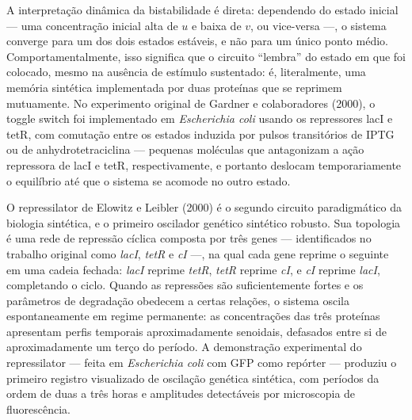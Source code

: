 A interpretação dinâmica da bistabilidade é direta: dependendo do estado inicial --- uma concentração inicial alta de $u$ e baixa de $v$, ou vice-versa ---, o sistema converge para um dos dois estados estáveis, e não para um único ponto médio. Comportamentalmente, isso significa que o circuito ``lembra'' do estado em que foi colocado, mesmo na ausência de estímulo sustentado: é, literalmente, uma memória sintética implementada por duas proteínas que se reprimem mutuamente. No experimento original de Gardner e colaboradores (2000), o toggle switch foi implementado em \textit{Escherichia coli} usando os repressores lacI e tetR, com comutação entre os estados induzida por pulsos transitórios de IPTG ou de anhydrotetraciclina --- pequenas moléculas que antagonizam a ação repressora de lacI e tetR, respectivamente, e portanto deslocam temporariamente o equilíbrio até que o sistema se acomode no outro estado.



O repressilator de Elowitz e Leibler (2000) é o segundo circuito paradigmático da biologia sintética, e o primeiro oscilador genético sintético robusto. Sua topologia é uma rede de repressão cíclica composta por três genes --- identificados no trabalho original como \textit{lacI}, \textit{tetR} e \textit{cI} ---, na qual cada gene reprime o seguinte em uma cadeia fechada: \textit{lacI} reprime \textit{tetR}, \textit{tetR} reprime \textit{cI}, e \textit{cI} reprime \textit{lacI}, completando o ciclo. Quando as repressões são suficientemente fortes e os parâmetros de degradação obedecem a certas relações, o sistema oscila espontaneamente em regime permanente: as concentrações das três proteínas apresentam perfis temporais aproximadamente senoidais, defasados entre si de aproximadamente um terço do período. A demonstração experimental do repressilator --- feita em \textit{Escherichia coli} com GFP como repórter --- produziu o primeiro registro visualizado de oscilação genética sintética, com períodos da ordem de duas a três horas e amplitudes detectáveis por microscopia de fluorescência.

